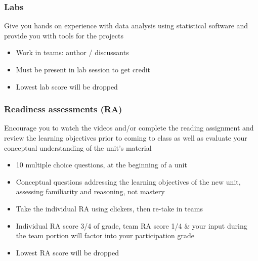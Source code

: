 \documentclass[11pt,containsverbatim,handout,xcolor=xelatex,dvipsnames,table]{beamer}
\begin{document}
\begin{frame}[fragile]
\frametitle{Labs}

 Give you hands on experience with data analysis using statistical software and provide you with tools for the projects

\begin{itemize}

\item Work in teams: author / discussants

\item Must be present in lab session to get credit

\item Lowest lab score will be dropped

\end{itemize}

\vfill

\pause


\end{frame}


\begin{frame}
\frametitle{Readiness assessments (RA)}

 Encourage you to watch the videos and/or complete the reading assignment and review the learning objectives prior to coming to class as well as evaluate your conceptual understanding of the unit's material

\begin{itemize}

\item 10 multiple choice questions, at the beginning of a unit

\item Conceptual questions addressing the learning objectives of the new unit, assessing familiarity and reasoning, not mastery

\item Take the individual RA using clickers, then re-take in teams

\item Individual RA score 3/4 of grade, team RA score 1/4 \& your input during the team portion will factor into your participation grade

\item Lowest RA score will be dropped

\end{itemize}

\end{frame}
\end{document}
